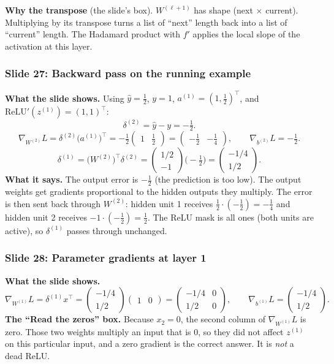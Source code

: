 \textbf{Why the transpose} (the slide's box). $W^{(\ell+1)}$ has shape (next $\times$ current). Multiplying by its transpose turns a list of ``next'' length back into a list of ``current'' length. The Hadamard product with $f'$ applies the local slope of the activation at this layer.

\subsubsection{Slide 27: Backward pass on the running example}

\textbf{What the slide shows.} Using $\hat{y}=\tfrac12$, $y=1$, $a^{(1)}=(1,\tfrac12)^\top$, and $\text{ReLU}'(z^{(1)})=(1,1)^\top$:
\[
\delta^{(2)}=\hat{y}-y=-\tfrac12 .
\]
\[
\nabla_{W^{(2)}}L=\delta^{(2)}\big(a^{(1)}\big)^\top=-\tfrac12\begin{pmatrix}1&\tfrac12\end{pmatrix}=\begin{pmatrix}-\tfrac12&-\tfrac14\end{pmatrix}, \qquad \nabla_{b^{(2)}}L=-\tfrac12 .
\]
\[
\delta^{(1)}=\big(W^{(2)}\big)^\top\delta^{(2)}=\begin{pmatrix}1/2\\-1\end{pmatrix}\Big(-\tfrac12\Big)=\begin{pmatrix}-1/4\\1/2\end{pmatrix}.
\]
\textbf{What it says.} The output error is $-\tfrac12$ (the prediction is too low). The output weights get gradients proportional to the hidden outputs they multiply. The error is then sent back through $W^{(2)}$: hidden unit 1 receives $\tfrac12\cdot(-\tfrac12) = -\tfrac14$ and hidden unit 2 receives $-1\cdot(-\tfrac12)=\tfrac12$. The ReLU mask is all ones (both units are active), so $\delta^{(1)}$ passes through unchanged.

\subsubsection{Slide 28: Parameter gradients at layer 1}

\textbf{What the slide shows.}
\[
\nabla_{W^{(1)}}L=\delta^{(1)}x^\top=\begin{pmatrix}-1/4\\1/2\end{pmatrix}\begin{pmatrix}1&0\end{pmatrix}=\begin{pmatrix}-1/4&0\\1/2&0\end{pmatrix}, \qquad \nabla_{b^{(1)}}L=\begin{pmatrix}-1/4\\1/2\end{pmatrix}.
\]
\textbf{The ``Read the zeros'' box.} Because $x_2=0$, the second column of $\nabla_{W^{(1)}}L$ is zero. Those two weights multiply an input that is $0$, so they did not affect $z^{(1)}$ on this particular input, and a zero gradient is the correct answer. It is \emph{not} a dead ReLU.

